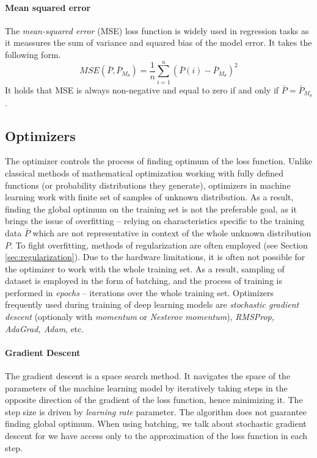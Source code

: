 \paragraph{Mean squared error}
The \emph{mean-squared error} (MSE) loss function is widely used in regression tasks as it meassures the sum of variance and squared bias of the model error. It takes the following form.
\begin{equation} \label{eqn:mse}
MSE(\bar{P}, \bar{P}_{M_\theta}) = \frac{1}{n} \sum\limits_{i=1}^{n} (\bar{P}(i) - \bar{P}_{M_\theta})^2
\end{equation}
It holds that MSE is always non-negative and equal to zero if and only if $\bar{P} = \bar{P}_{M_\theta}$.

\subsection{Optimizers}
\label{sec:optimizers}

The optimizer controls the process of finding optimum of the loss function. Unlike classical methods of mathematical optimization working with fully defined functions (or probability distributions they generate), optimizers in machine learning work with finite set of samples of unknown distribution. As a result, finding the global optimum on the training set is not the preferable goal, as it brings the issue of overfitting -- relying on characteristics specific to the training data $\bar{P}$ which are not representative in context of the whole unknown distribution $P$. To fight overfitting, methods of regularization are often employed (see Section \ref{sec:regularization}). Due to the hardware limitations, it is often not possible for the optimizer to work with the whole training set. As a result, sampling of dataset is employed in the form of batching, and the process of training is performed in \emph{epochs} -- iterations over the whole training set. Optimizers frequently used during training of deep learning models are \emph{stochastic gradient descent} (optionaly with \emph{momentum} or \emph{Nesterov momentum}), \emph{RMSProp, AdaGrad, Adam}, etc.

\paragraph{Gradient Descent}

The gradient descent is a space search method. It navigates the space of the parameters of the machine learning model by iteratively taking steps in the opposite direction of the gradient of the loss function, hence minimizing it. The step size is driven by \emph{learning rate} parameter. The algorithm does not guarantee finding global optimum. When using batching, we talk about stochastic gradient descent for we have access only to the approximation of the loss function in each step.

